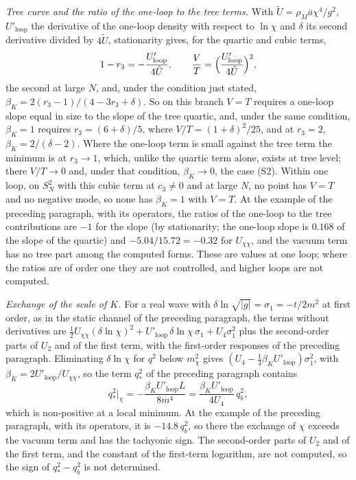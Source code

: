 \emph{Tree curve and the ratio of the one-loop to the tree terms.} With \(\tilde U=\rho_M\bar a\chi^4/g^2\), \(U'_{\mathrm{loop}}\) the derivative of the one-loop density with respect to \(\ln\chi\) and \(\delta\) its second derivative divided by \(4\tilde U\), stationarity gives, for the quartic and cubic terms,
\[
  1-r_3=-\frac{U'_{\mathrm{loop}}}{4\tilde U},\qquad \frac VT=\Bigl(\frac{U'_{\mathrm{loop}}}{4\tilde U}\Bigr)^2 ,
\]
the second at large \(N\), and, under the condition just stated, \(\beta_K=2(r_3-1)/(4-3r_3+\delta)\). So on this branch \(V=T\) requires a one-loop slope equal in size to the slope of the tree quartic, and, under the same condition, \(\beta_K=1\) requires \(r_3=(6+\delta)/5\), where \(V/T=(1+\delta)^2/25\), and at \(r_3=2\), \(\beta_K=2/(\delta-2)\). Where the one-loop term is small against the tree term the minimum is at \(r_3\to1\), which, unlike the quartic term alone, exists at tree level; there \(V/T\to0\) and, under that condition, \(\beta_K\to0\), the case (S2). Within one loop, on \(S^2_N\) with this cubic term at \(c_3\ne0\) and at large \(N\), no point has \(V=T\) and no negative mode, so none has \(\beta_K=1\) with \(V=T\). At the example of the preceding paragraph, with its operators, the ratios of the one-loop to the tree contributions are \(-1\) for the slope (by stationarity; the one-loop slope is \(0.168\) of the slope of the quartic) and \(-5.04/15.72=-0.32\) for \(U_{\chi\chi}\), and the vacuum term has no tree part among the computed forms. These are values at one loop; where the ratios are of order one they are not controlled, and higher loops are not computed.

\emph{Exchange of the scale of \(K\).} For a real wave with \(\delta\ln\sqrt{|g|}=\sigma_1=-t/2m^2\) at first order, as in the static channel of the preceding paragraph, the terms without derivatives are \(\tfrac12U_{\chi\chi}(\delta\ln\chi)^2+U'_{\mathrm{loop}}\,\delta\ln\chi\,\sigma_1+U_4\sigma_1^2\) plus the second-order parts of \(U_2\) and of the first term, with the first-order responses of the preceding paragraph. Eliminating \(\delta\ln\chi\) for \(q^2\) below \(m_\chi^2\) gives \((U_4-\tfrac14\beta_KU'_{\mathrm{loop}})\sigma_1^2\), with \(\beta_K=2U'_{\mathrm{loop}}/U_{\chi\chi}\), so the term \(q_*^2\) of the preceding paragraph contains
\[
  q_*^2\big|_\chi=-\frac{\beta_KU'_{\mathrm{loop}}L}{8m^4}=\frac{\beta_KU'_{\mathrm{loop}}}{4U_4}\,q_b^2 ,
\]
which is non-positive at a local minimum. At the example of the preceding paragraph, with its operators, it is \(-14.8\,q_b^2\), so there the exchange of \(\chi\) exceeds the vacuum term and has the tachyonic sign. The second-order parts of \(U_2\) and of the first term, and the constant of the first-term logarithm, are not computed, so the sign of \(q_*^2-q_b^2\) is not determined.

